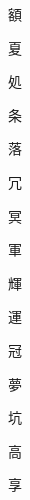 \begin{spacing}{2.5}
{\Huge \begin{CJK}{UTF8}{min} 額\end{CJK}}\hspace{0.1cm}
{\Huge \begin{CJK}{UTF8}{min} 夏\end{CJK}}\hspace{0.1cm}
{\Huge \begin{CJK}{UTF8}{min} 処\end{CJK}}\hspace{0.1cm}
{\Huge \begin{CJK}{UTF8}{min} 条\end{CJK}}\hspace{0.1cm}
{\Huge \begin{CJK}{UTF8}{min} 落\end{CJK}}\hspace{0.1cm}
{\Huge \begin{CJK}{UTF8}{min} 冗\end{CJK}}\hspace{0.1cm}
{\Huge \begin{CJK}{UTF8}{min} 冥\end{CJK}}\hspace{0.1cm}
{\Huge \begin{CJK}{UTF8}{min} 軍\end{CJK}}\hspace{0.1cm}
{\Huge \begin{CJK}{UTF8}{min} 輝\end{CJK}}\hspace{0.1cm}
{\Huge \begin{CJK}{UTF8}{min} 運\end{CJK}}\hspace{0.1cm}
{\Huge \begin{CJK}{UTF8}{min} 冠\end{CJK}}\hspace{0.1cm}
{\Huge \begin{CJK}{UTF8}{min} 夢\end{CJK}}\hspace{0.1cm}
{\Huge \begin{CJK}{UTF8}{min} 坑\end{CJK}}\hspace{0.1cm}
{\Huge \begin{CJK}{UTF8}{min} 高\end{CJK}}\hspace{0.1cm}
{\Huge \begin{CJK}{UTF8}{min} 享\end{CJK}}\hspace{0.1cm}

\end{spacing}
